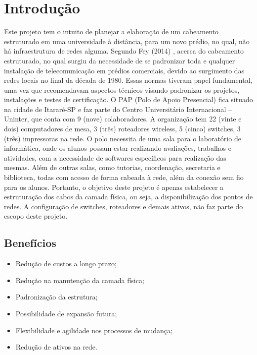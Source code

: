 \documentclass[	DIV=calc,%
							paper=a4,%
							fontsize=12pt,%
							onecolumn]{scrartcl}	 					%
\begin{document}
\section{Introdução}
Este projeto tem o intuito de planejar a elaboração de um cabeamento estruturado em uma universidade à distância, para um novo prédio, no qual, não há infraestrutura de redes alguma. 
Segundo Fey (2014) \cite{ref1}, acerca do cabeamento estruturado, no qual surgiu da necessidade de se padronizar toda e qualquer instalação de telecomunicação em prédios comerciais, devido ao surgimento das redes locais no final da década de 1980. Essas normas tiveram papel fundamental, uma vez que recomendavam aspectos técnicos visando padronizar os projetos, instalações e testes de certificação.
O PAP (Polo de Apoio Presencial) fica situado na cidade de Itararé-SP e faz parte do Centro Universitário Internacional – Uninter, que conta com 9 (nove) colaboradores.
A organização tem 22 (vinte e dois) computadores de mesa, 3 (três) roteadores wireless, 5 (cinco) switches, 3 (três) impressoras na rede.
O polo necessita de uma sala para o laboratório de informática, onde os alunos possam estar realizando avaliações, trabalhos e atividades, com a necessidade de softwares específicos para realização das mesmas. Além de outras salas, como tutorias, coordenação, secretaria e biblioteca, todas com acesso de forma cabeada à rede, além da conexão sem fio para os alunos.
Portanto, o objetivo deste projeto é apenas estabelecer a estruturação dos cabos da camada física, ou seja, a disponibilização dos pontos de redes. A configuração de switches, roteadores e demais ativos, não faz parte do escopo deste projeto.

\subsection{Benefícios}
\begin{itemize}
	\item Redução de custos a longo prazo;
	\item Redução na manutenção da camada física;
	\item Padronização da estrutura;
	\item Possibilidade de expansão futura;
	\item Flexibilidade e agilidade nos processos de mudança;
	\item Redução de ativos na rede.
\end{itemize}
\end{document}
